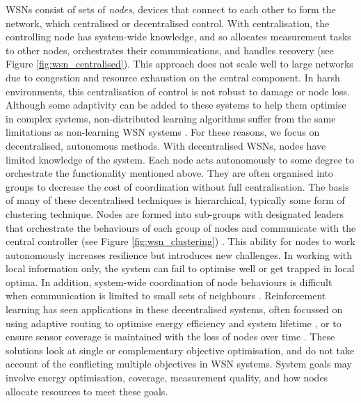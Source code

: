 WSNs consist of sets of \textit{nodes}, devices that connect to each other to form the network, which centralised or decentralised control. With centralisation, the controlling node has system-wide knowledge, and so allocates measurement tasks to other nodes, orchestrates their communications, and handles recovery (see Figure \ref{fig:wsn_centralised}). This approach does not scale well to large networks due to congestion and resource exhaustion on the central component. In harsh environments, this centralisation of control is not robust to damage or node loss. Although some adaptivity can be added to these systems to help them optimise in complex systems, non-distributed learning algorithms suffer from the same limitations as non-learning WSN systems \citep{Imagestate2006}. For these reasons, we focus on decentralised, autonomous methods.
With decentralised WSNs, nodes have limited knowledge of the system. Each node acts autonomously to some degree to orchestrate the functionality mentioned above. They are often organised into groups to decrease the cost of coordination without full centralisation. The basis of many of these decentralised techniques is hierarchical, typically some form of clustering technique. Nodes are formed into sub-groups with designated leaders that orchestrate the behaviours of each group of nodes and communicate with the central controller (see Figure \ref{fig:wsn_clustering}) . This ability for nodes to work autonomously increases resilience but introduces new challenges. In working with local information only, the system can fail to optimise well or get trapped in local optima. In addition, system-wide coordination of node behaviours is difficult when communication is limited to small sets of neighbours \citep{Carlos-Mancilla2016}. Reinforcement learning has seen applications in these decentralised systems, often focussed on using adaptive routing  to optimise energy efficiency and system lifetime \citep{ 10.1504/IJCNDS.2012.048871, Kulkarnib}, or to ensure sensor coverage is maintained with the loss of nodes over time \citep{Sharma2020}. These solutions look at single or complementary objective optimisation, and do not take account of the conflicting multiple objectives in WSN systems. System goals may involve energy optimisation, coverage, measurement quality, and how nodes allocate resources to meet these goals. 

